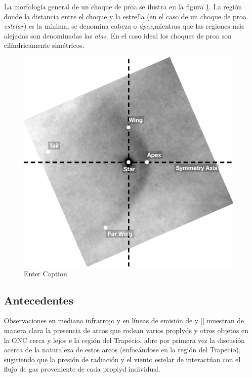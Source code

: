 La morfología general de un choque de proa se ilustra en la figura \ref{fig:terminology}. La región donde la distancia entre el choque y la estrella (en el caso de un choque de proa \textit{estelar}) es la mínima, se denomina cabeza o \textit{ápex},mientras que las regiones más alejadas son denominadas las \textit{alas}. En el caso ideal los choques de proa son cilíndricamente simétricos.

\begin{figure}
  \includegraphics[width=0.7\linewidth]{./Figures/bow-terminology}
  \caption{Enter Caption}
  \label{fig:terminology}
\end{figure}

\subsection{Antecedentes}
Observaciones en mediano infrarrojo y en líneas de emisión de  y [] \citep{Robberto:2005, Bally:1998, Bally:2000} muestran de manera clara la presencia de arcos que rodean varios proplyds y otros objetos en la ONC cerca y lejos e la región del Trapecio. \citet{Hayward:1994} abre por primera vez la discusión acerca de la naturaleza de estos arcos (enfocándose en la región del Trapecio), sugiriendo que la presión de radiación y el viento estelar de \thC{} interactúan con el flujo de gas proveniente de cada proplyd individual.

